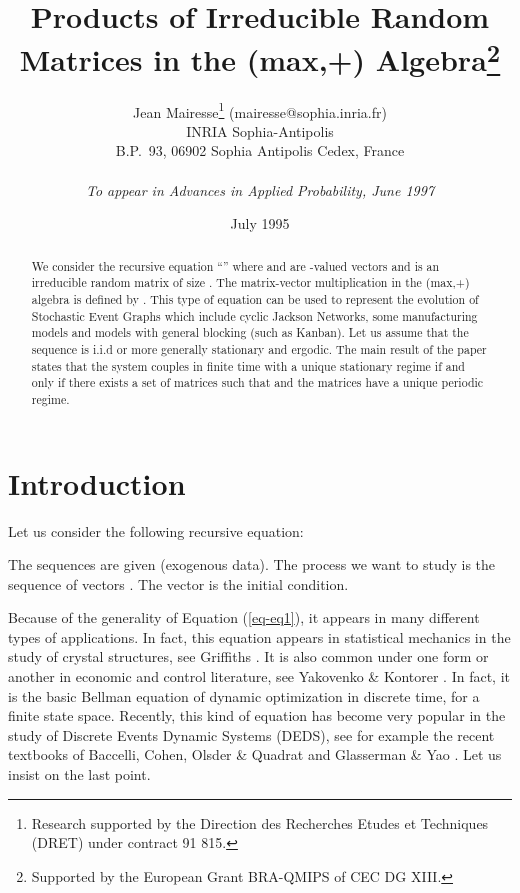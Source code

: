 \documentclass[11pt,titlepage]{article}
\title{Products of Irreducible Random Matrices in the (max,+)
Algebra\thanks{Supported by  
 the European Grant BRA-QMIPS of CEC
DG XIII.}}
\author{ Jean Mairesse\thanks{Research supported by the Direction des
Recherches 
Etudes et Techniques (DRET) under contract  91 815.}
(mairesse@sophia.inria.fr)  \\ 
INRIA Sophia-Antipolis \\ B.P.\ 93, 06902 Sophia Antipolis Cedex,
France \\ \\ 
{\it To appear in {\rm Advances in Applied Probability}, June 1997}}
\date{July 1995}
\begin{document}
\maketitle

\noindent
\begin{abstract}
We consider the recursive equation ``''
where  and  are 
-valued vectors and  is an irreducible
random
matrix of size . The matrix-vector multiplication in the
(max,+) algebra is defined by . This type of equation can be used to
represent the evolution of Stochastic Event Graphs which include cyclic
Jackson Networks, some manufacturing models and 
models with general
blocking (such as Kanban). Let us assume that the sequence  is i.i.d or more 
generally stationary and ergodic. The main result of the paper states that the
system couples  
in finite time with a unique stationary regime if and only
if there exists a set of matrices  such that 
and the matrices  have a unique periodic regime.
\end{abstract} 


\section{Introduction}
\label{se-intro}
Let us consider the following recursive equation:
 
The sequences  are given (exogenous data).
The process we want 
to
study is the sequence of  vectors . 
The vector  is the initial condition. 

Because of the generality of Equation (\ref{eq-eq1}), it appears
in many different types of applications. In fact, this
equation appears in statistical mechanics in the study of crystal structures,
see Griffiths \cite{grif}.
It is also common under one form or another in economic and control
literature, see Yakovenko \& Kontorer \cite{YaKo}. In fact, it is the basic
Bellman equation of 
dynamic 
optimization in discrete time, for a finite state space. 
Recently, this kind of
equation has become very popular in the study of Discrete Events Dynamic
Systems (DEDS), see for example the recent textbooks of Baccelli, Cohen,
Olsder \& Quadrat \cite{BCOQ} and Glasserman \& Yao \cite{GlYa}. Let us
insist on 
the last point. 
\end{document}
